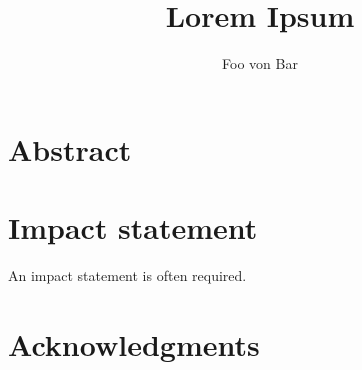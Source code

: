 \documentclass[british,a4paper,11pt,twoside]{StyleThese}
\title{Lorem Ipsum}\let\thetitle\@title
\author{Foo von Bar}\let\theauthor\@author
\begin{document}
\frontmatter


%

\dominitoc

\copyrightpage{\the\year}{\theauthor}
\declarationpage{\theauthor}

\cleardoublepage
\chapter{Abstract}


\cleardoublepage
\chapter{Impact statement}
An impact statement is often required.

\cleardoublepage
\chapter{Acknowledgments}


\cleardoublepage
\tableofcontents

\clearpage
\listoftables
\clearpage
\listoffigures

\mainmatter







\backmatter


\end{document}

